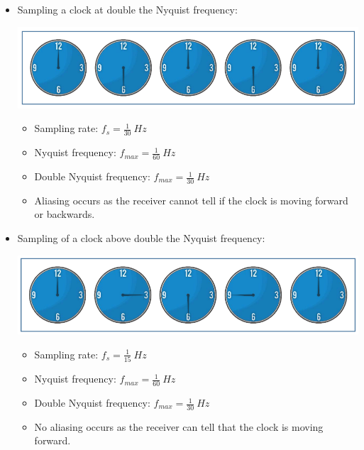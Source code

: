 \documentclass[11pt]{article}
\begin{document}
\begin{itemize}
\item Sampling a clock at double the Nyquist frequency:
\begin{center}
\includegraphics[width=.9\linewidth]{./images/sampling-clock-at-double-nyquist-frequency.png}
\end{center}

\begin{itemize}
\item Sampling rate: \(f_s = \frac{1}{30} \ \unit{Hz}\)
\item Nyquist frequency: \(f_{max} = \frac{1}{60} \ \unit{Hz}\)
\item Double Nyquist frequency: \(f_{max} = \frac{1}{30} \ \unit{Hz}\)
\item Aliasing occurs as the receiver cannot tell if the clock is moving forward or backwards.
\end{itemize}

\item Sampling of a clock above double the Nyquist frequency:
\begin{center}
\includegraphics[width=.9\linewidth]{./images/sampling-clock-above-double-nyquist-frequency.png}
\end{center}

\begin{itemize}
\item Sampling rate: \(f_s = \frac{1}{15} \ \unit{Hz}\)
\item Nyquist frequency: \(f_{max} = \frac{1}{60} \ \unit{Hz}\)
\item Double Nyquist frequency: \(f_{max} = \frac{1}{30} \ \unit{Hz}\)
\item No aliasing occurs as the receiver can tell that the clock is moving forward.
\end{itemize}
\end{itemize}
\end{document}
